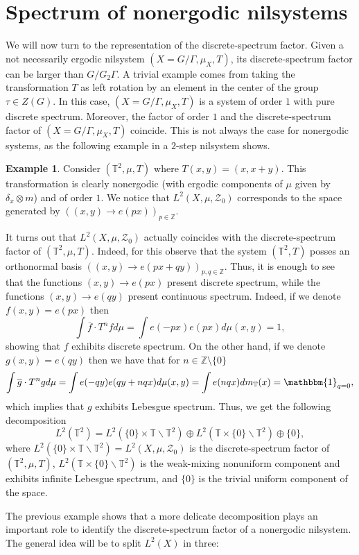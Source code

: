 \documentclass[letter, 11pt]{article}
\theoremstyle{definition}
\newtheorem{example}[theorem]{Example}
\theoremstyle{plain}
\newcommand{\Z}{\mathbb{Z}}
\newcommand{\T}{\mathbb{T}}
\newcommand{\ind}[1]{\mathbbm{1}_{#1}}
\newcommand{\1}{\mathbbm{1}}
\begin{document}
\section{Spectrum of nonergodic nilsystems}
We will now turn to the representation of the discrete-spectrum factor. Given a not necessarily ergodic nilsystem $(X=G/\Gamma,\mu_X,T)$, its discrete-spectrum factor can be larger than $G/G_2\Gamma$. A trivial example comes from taking the transformation $T$ as left rotation by an element in the center of the group $\tau\in Z(G)$. In this case, $(X=G/\Gamma,\mu_X,T)$ is a system of order $1$ with pure discrete spectrum. Moreover, the factor of order $1$ and the discrete-spectrum factor of $(X=G/\Gamma,\mu_X,T)$ coincide. This is not always the case for nonergodic systems, as the following example in a $2$-step nilsystem shows.
\begin{example}\label{example-2.1}
    Consider $(\T^2,\mu,T)$ where $T(x,y)=(x,x+y)$. This transformation is clearly nonergodic (with ergodic components of $\mu$ given by $\delta_x\otimes m$) and of order $1$. We notice that $L^2(X,\mu, \mathcal{Z}_0)$ corresponds to the space generated by $((x,y)\to e(px))_{p\in \Z}$. 
    
    It turns out that $L^2(X,\mu,\mathcal{Z}_0)$ actually coincides with the discrete-spectrum factor of $(\T^2,\mu,T)$. Indeed, for this observe that the system $(\T^2,T)$ posses an orthonormal basis $((x,y)\to e(px+qy))_{p,q\in \Z}$. Thus, it is enough to see that the functions $(x,y)\to e(px)$ present discrete spectrum, while the functions $(x,y)\to e(qy)$ present continuous spectrum. Indeed, if we denote $f(x,y)=e(px)$ then
    $$\int \overline{f} \cdot T^n f d\mu = \int e(-px) e(px) d\mu(x,y)= 1,   $$
    showing that $f$ exhibits discrete spectrum. 
    On the other hand, if we denote $g(x,y)=e(qy)$ then we have that for $n\in \Z\setminus\{0\}$
    $$\int \overline{g} \cdot T^n g d\mu = \int e(-qy) e(qy + nqx) d\mu(x,y) = \int e(nqx) dm_\T(x) = \ind{q=0},  $$
    which implies that $g$ exhibits Lebesgue spectrum. Thus, we get the following decomposition 
    $$L^2(\T^2)= L^2(\{0\}\times \T \backslash \T^2)\oplus L^2(\T\times \{0\} \backslash \T^2) \oplus \{0\}, $$
    where $L^2(\{0\}\times \T \backslash \T^2)=L^2(X,\mu,\mathcal{Z}_0)$ is the discrete-spectrum factor of $(\T^2,\mu,T)$, $ L^2(\T\times \{0\} \backslash \T^2)$ is the weak-mixing nonuniform component and exhibits infinite Lebesgue spectrum, and $\{0\}$ is the trivial uniform component of the space.  
\end{example}
The previous example shows that a more delicate decomposition plays an important role to identify the discrete-spectrum factor of a nonergodic nilsystem. The general idea will be to split $L^2(X)$ in three:
\end{document}
